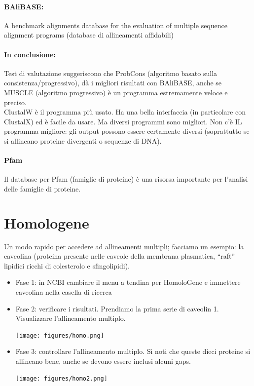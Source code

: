 \documentclass{article}
\begin{document}
\paragraph{BAliBASE:} A benchmark
alignments database for
the evaluation of multiple
sequence alignment
programs
(database di allineamenti
affidabili)
\paragraph{In conclusione: } Test di valutazione suggeriscono che
ProbCons (algoritmo basato sulla consistenza/progressivo),
dà i migliori risultati con BAliBASE, anche se MUSCLE
(algoritmo progressivo) è un programma estremamente
veloce e preciso.\\
ClustalW è il programma più usato. Ha una bella interfaccia
(in particolare con ClustalX) ed è facile da usare. Ma diversi
programmi sono migliori. Non c'è IL programma migliore: gli
output possono essere certamente diversi (soprattutto se si
allineano proteine divergenti o sequenze di DNA).
\paragraph{Pfam} Il database per Pfam (famiglie di proteine) è una risorsa
importante per l'analisi delle famiglie di proteine.
\section{Homologene}
Un modo rapido per accedere ad allineamenti
multipli; facciamo un esempio: la caveolina (proteina presente nelle caveole della
membrana plasmatica, “raft” lipidici ricchi di colesterolo e
sfingolipidi).
\begin{itemize}
    \item Fase 1: in NCBI cambiare il menu a tendina per HomoloGene
    e immettere caveolina nella casella di ricerca
    \item Fase 2: verificare i risultati. Prendiamo la prima serie di
    caveolin 1. Visualizzare l'allineamento multiplo.\\
    \begin{center}
        \texttt{[image: figures/homo.png]}
    \end{center}
    \item Fase 3: controllare l'allineamento multiplo.
    Si noti che queste dieci proteine si allineano bene, anche se
    devono essere inclusi alcuni gaps.\\
    \begin{center}
        \texttt{[image: figures/homo2.png]}
    \end{center}
\end{itemize}
\end{document}
